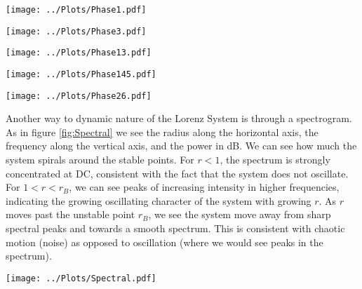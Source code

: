 \documentclass[twocolumn]{myarticle}
\begin{document}
\begin{figure*}[htb]
    \centering
    \texttt{[image: ../Plots/Phase1.pdf]}
    \caption{Time series, phase space, and DFT of the Lorenz System for R=1}
    \label{fig:Phase1}
\end{figure*}
\begin{figure*}[htb]
    \centering
    \texttt{[image: ../Plots/Phase3.pdf]}
    \caption{Time series, phase space, and DFT of the Lorenz System for R=3}
    \label{fig:Phase3}
\end{figure*}
\begin{figure*}[htb]
    \centering
    \texttt{[image: ../Plots/Phase13.pdf]}
    \caption{Time series, phase space, and DFT of the Lorenz System for R=13}
    \label{fig:Phase13}
\end{figure*}
\begin{figure*}[htb]
    \centering
    \texttt{[image: ../Plots/Phase145.pdf]}
    \caption{Time series, phase space, and DFT of the Lorenz System for R=14.5}
    \label{fig:Phase145}
\end{figure*}
\begin{figure*}[htb]
    \centering
    \texttt{[image: ../Plots/Phase26.pdf]}
    \caption{Time series, phase space, and DFT of the Lorenz System for R=26}
    \label{fig:Phase26}
\end{figure*}


Another way to dynamic nature of the Lorenz System is through a spectrogram. 
As in figure \ref{fig:Spectral} we see the radius along the horizontal axis, the frequency along the vertical axis, and the power in dB. 
We can see how much the system spirals around the stable points. 
For $ r < 1 $, the spectrum is strongly concentrated at DC, consistent with the fact that the system does not oscillate.
For $ 1 < r < r_B $, we can see peaks of increasing intensity in higher frequencies, indicating the growing oscillating character of the system with growing $ r $.
As $ r $ moves past the unstable point $ r_B $, we see the system move away from sharp spectral peaks and towards a smooth spectrum.
This is consistent with chaotic motion (noise) as opposed to oscillation (where we would see peaks in the spectrum).

\begin{figure*}[htb]
    \centering
    \texttt{[image: ../Plots/Spectral.pdf]}
    \caption{Spectrogram showing the DFT of x(t). The Power in dB is displayed in the colour, the frequency along the y-axis and the radius along the x-axis}
    \label{fig:Spectral}
\end{figure*}
\end{document}

